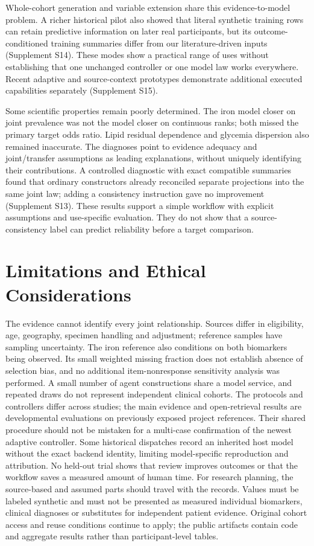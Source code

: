 \documentclass[11pt,letterpaper]{article}
\begin{document}
Whole-cohort generation and variable extension share this evidence-to-model problem. A richer historical pilot also showed that literal synthetic training rows can retain predictive information on later real participants, but its outcome-conditioned training summaries differ from our literature-driven inputs (Supplement S14). These modes show a practical range of uses without establishing that one unchanged controller or one model law works everywhere. Recent adaptive and source-context prototypes demonstrate additional executed capabilities separately (Supplement S15).


Some scientific properties remain poorly determined. The iron model closer on joint prevalence was not the model closer on continuous ranks; both missed the primary target odds ratio. Lipid residual dependence and glycemia dispersion also remained inaccurate. The diagnoses point to evidence adequacy and joint/\allowbreak{}transfer assumptions as leading explanations, without uniquely identifying their contributions. A controlled diagnostic with exact compatible summaries found that ordinary constructors already reconciled separate projections into the same joint law; adding a consistency instruction gave no improvement (Supplement S13). These results support a simple workflow with explicit assumptions and use-specific evaluation. They do not show that a source-consistency label can predict reliability before a target comparison.


\section{Limitations and Ethical Considerations}

The evidence cannot identify every joint relationship. Sources differ in eligibility, age, geography, specimen handling and adjustment; reference samples have sampling uncertainty. The iron reference also conditions on both biomarkers being observed. Its small weighted missing fraction does not establish absence of selection bias, and no additional item-nonresponse sensitivity analysis was performed. A small number of agent constructions share a model service, and repeated draws do not represent independent clinical cohorts. The protocols and controllers differ across studies; the main evidence and open-retrieval results are developmental evaluations on previously exposed project references. Their shared procedure should not be mistaken for a multi-case confirmation of the newest adaptive controller. Some historical dispatches record an inherited host model without the exact backend identity, limiting model-specific reproduction and attribution. No held-out trial shows that review improves outcomes or that the workflow saves a measured amount of human time. For research planning, the source-based and assumed parts should travel with the records. Values must be labeled synthetic and must not be presented as measured individual biomarkers, clinical diagnoses or substitutes for independent patient evidence. Original cohort access and reuse conditions continue to apply; the public artifacts contain code and aggregate results rather than participant-level tables.
\end{document}
